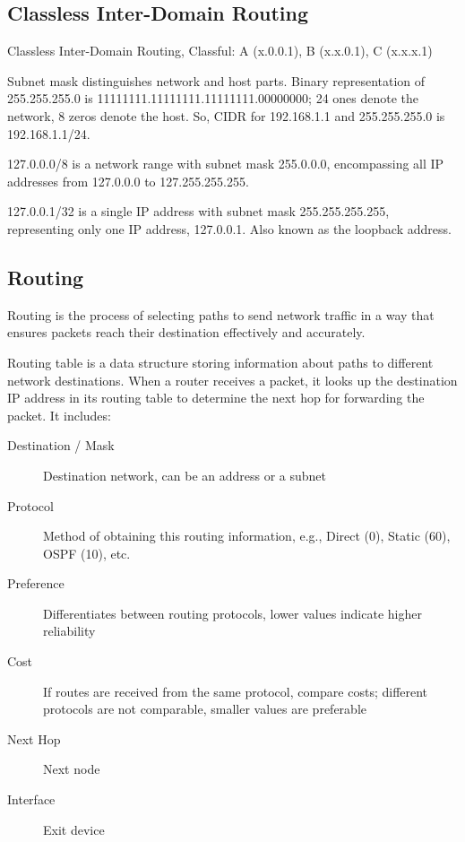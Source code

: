 \documentclass[11pt,journal,compsoc]{IEEEtran}
\begin{document}
\subsection{Classless Inter-Domain Routing}

Classless Inter-Domain Routing, Classful: A (x.0.0.1), B (x.x.0.1), C (x.x.x.1)

Subnet mask distinguishes network and host parts. Binary representation of 255.255.255.0 is 11111111.11111111.11111111.00000000; 24 ones denote the network, 8 zeros denote the host. So, CIDR for 192.168.1.1 and 255.255.255.0 is 192.168.1.1/24.

127.0.0.0/8 is a network range with subnet mask 255.0.0.0, encompassing all IP addresses from 127.0.0.0 to 127.255.255.255.

127.0.0.1/32 is a single IP address with subnet mask 255.255.255.255, representing only one IP address, 127.0.0.1. Also known as the loopback address.


\subsection{Routing}

Routing is the process of selecting paths to send network traffic in a way that ensures packets reach their destination effectively and accurately.

Routing table is a data structure storing information about paths to different network destinations. When a router receives a packet, it looks up the destination IP address in its routing table to determine the next hop for forwarding the packet. It includes:

\begin{description}
    \item[Destination / Mask] Destination network, can be an address or a subnet

    \item[Protocol] Method of obtaining this routing information, e.g., Direct (0), Static (60), OSPF (10), etc.

    \item[Preference] Differentiates between routing protocols, lower values indicate higher reliability

    \item[Cost] If routes are received from the same protocol, compare costs; different protocols are not comparable, smaller values are preferable

    \item[Next Hop] Next node

    \item[Interface] Exit device
\end{description}
\end{document}
